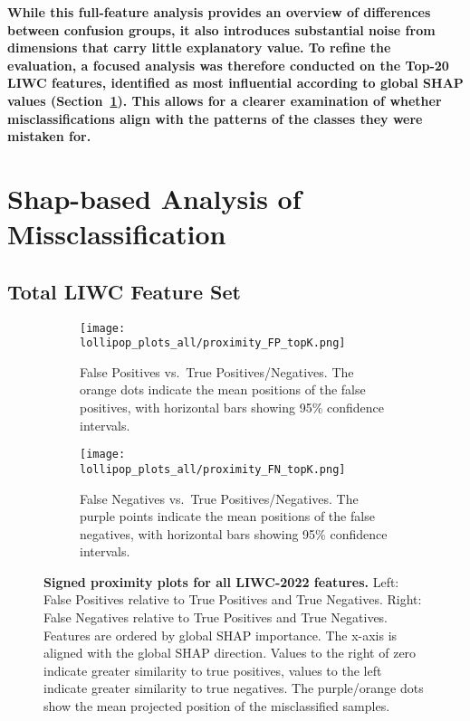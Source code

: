 \textbf{While this full-feature analysis provides an overview of differences between confusion groups, it also introduces substantial noise from dimensions that carry little explanatory value. To refine the evaluation, a focused analysis was therefore conducted on the Top-20 LIWC features, identified as most influential according to global SHAP values (Section~\ref{sec:shap_missclassification_analysis}). 
This allows for a clearer examination of whether misclassifications 
align with the patterns of the classes they were mistaken for.}


\section{Shap-based Analysis of Missclassification} \label{sec:shap_missclassification_analysis} 

\subsection{Total LIWC Feature Set}

\begin{figure}[H]
  \centering

  \begin{subfigure}[t]{0.49\textwidth}
    \centering
    \texttt{[image: lollipop\_plots\_all/proximity\_FP\_topK.png]}
    \caption{False Positives vs.\ True Positives/Negatives. The \textcolor{orange!70!black}{orange} dots indicate the mean positions of the false positives, with horizontal bars showing 95\% confidence intervals.}
    \label{fig:lollipop_fp_all}
  \end{subfigure}\hfill
  \begin{subfigure}[t]{0.49\textwidth}
    \centering
    \texttt{[image: lollipop\_plots\_all/proximity\_FN\_topK.png]}
    \caption{False Negatives vs.\ True Positives/Negatives. The \textcolor{purple!70!black}{purple points} indicate the mean positions of the false negatives, with horizontal bars showing 95\% confidence intervals.}
    \label{fig:lollipop_fn_all}
  \end{subfigure}

  \caption[Signed proximity plots for all LIWC-2022 features.]{\textbf{Signed proximity plots for all LIWC-2022 features.} 
  Left: False Positives relative to True Positives and True Negatives. 
  Right: False Negatives relative to True Positives and True Negatives. 
  Features are ordered by global SHAP importance. The x-axis is aligned with the global SHAP direction. Values to the right of zero indicate greater similarity to true positives, values to the left indicate greater similarity to true negatives. The purple/orange dots show the mean projected position of the misclassified samples.}
  \label{fig:lollipop_all}
\end{figure}


